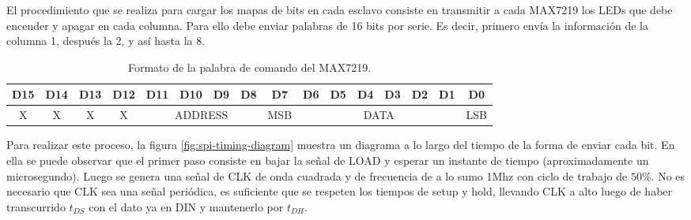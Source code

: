 El procedimiento que se realiza para cargar los mapas de bits en cada esclavo consiste en transmitir a cada MAX7219 los LEDs que debe encender y apagar en cada columna. Para ello debe enviar palabras de 16 bits por serie. Es decir, primero envía la información de la columna 1, después la 2, y así hasta la 8.

\begin{table}[ht]
	\centering
	\caption{Formato de la palabra de comando del MAX7219.}
	\label{table:trama-spi}
	\begin{adjustbox}{max width=\textwidth}
	\begin{tabular}{|c|c|c|c|c|c|c|c|c|c|c|c|c|c|c|c|}
	\hline
	D15 & D14 & D13 & D12 & D11   & D10   & D9   & D8   & D7 & D6 & D5 & D4 & D3 & D2 & D1 & D0 \\ \hline
	X   & X   & X   & X   & \multicolumn{4}{c|}{ADDRESS} & \multicolumn{1}{c}{ MSB } & \multicolumn{6}{c}{ DATA } & \multicolumn{1}{c|}{ LSB } \\ \hline
	\end{tabular}
	\end{adjustbox}
\end{table}

Para realizar este proceso, la figura \ref{fig:spi-timing-diagram} muestra un diagrama a lo largo del tiempo de la forma de enviar cada bit. En ella se puede observar que el primer paso consiste en bajar la señal de LOAD y esperar un instante de tiempo (aproximadamente un microsegundo). Luego se genera una señal de CLK de onda cuadrada y de frecuencia de a lo sumo 1Mhz con ciclo de trabajo de $50 \%$. No es necesario que CLK sea una señal periódica, es suficiente que se respeten los tiempos de setup y hold, llevando CLK a alto luego de haber transcurrido $t_{DS}$ con el dato ya en DIN y mantenerlo por $t_{DH}$.


